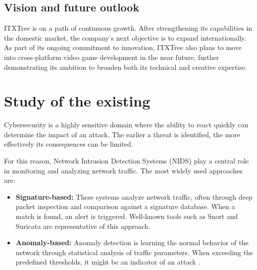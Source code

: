 \subsection{Vision and future outlook}
ITXTree is on a path of continuous growth. After strengthening its capabilities in the domestic market, the company's next objective is to expand internationally. As part of its ongoing commitment to innovation, ITXTree also plans to move into cross-platform video game development in the near future, further demonstrating its ambition to broaden both its technical and creative expertise.

\section{Study of the existing}
Cybersecurity is a highly sensitive domain where the ability to react quickly can determine the impact of an attack. The earlier a threat is identified, the more effectively its consequences can be limited.

For this reason, Network Intrusion Detection Systems (NIDS) play a central role in monitoring and analyzing network traffic. The most widely used approaches are:
\begin{itemize}
    \item \textbf{Signature-based:} These systems analyze network traffic, often through deep packet inspection and comparison against a signature database. When a match is found, an alert is triggered. Well-known tools such as Snort \cite{Snort} and Suricata \cite{Suricata} are representative of this approach.
    \item \textbf{Anomaly-based:} Anomaly detection is learning the normal behavior of the network through statistical analysis of traffic parameters. When exceeding the predefined thresholds, it might be an indicator of an attack \cite{Jackson2010}.
\end{itemize}
\vspace{-0.5cm}
